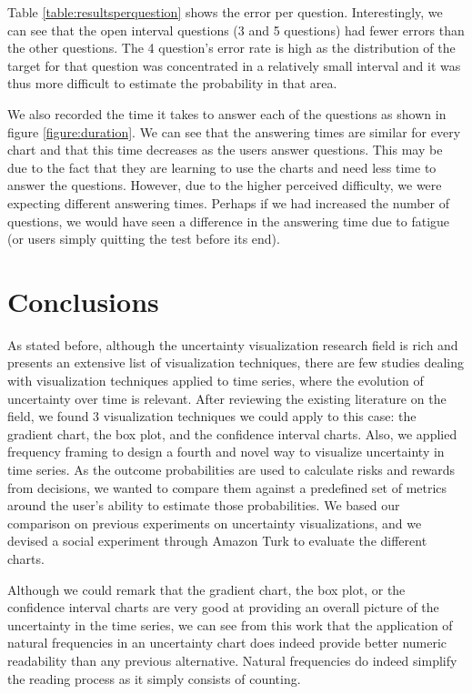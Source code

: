 \documentclass[a4paper,3p,sort&compress]{elsarticle}
\begin{document}
Table \ref{table:resultsperquestion} shows the error per question.
Interestingly, we can see that the open interval questions (3 and
5 questions) had fewer errors than the other questions. The 4
question's error rate is high as the distribution of the target for that
question was concentrated in a relatively small interval and it was thus more
difficult to estimate the probability in that area.

We also recorded the time it takes to answer each of the questions as shown in
figure \ref{figure:duration}. We can see that the answering times are similar
for every chart and that this time decreases as the users answer questions. This
may be due to the fact that they are learning to use the charts and need less
time to answer the questions. However, due to the higher perceived difficulty,
we were expecting different answering times. Perhaps if we had increased the
number of questions, we would have seen a difference in the answering time due
to fatigue (or users simply quitting the test before its end).

\section{Conclusions}
\label{sec:concl}

As stated before, although the uncertainty visualization research field is rich
and presents an extensive list of visualization techniques, there are few
studies dealing with visualization techniques applied to time series, where the
evolution of uncertainty over time is relevant. After reviewing the existing
literature on the field, we found 3 visualization techniques we could apply to
this case: the gradient chart, the box plot, and the confidence interval charts.
Also, we applied frequency framing to design a fourth and novel way to visualize
uncertainty in time series. As the outcome probabilities are used to calculate
risks and rewards from decisions, we wanted to compare them against a predefined
set of metrics around the user's ability to estimate those probabilities. We
based our comparison on previous experiments on uncertainty visualizations, and
we devised a social experiment through Amazon Turk to evaluate the different
charts.

Although we could remark that the gradient chart, the box plot, or the
confidence interval charts are very good at providing an overall picture of the
uncertainty in the time series, we can see from this work that the application
of natural frequencies in an uncertainty chart does indeed provide better
numeric readability than any previous alternative. Natural frequencies do indeed
simplify the reading process as it simply consists of counting.
\end{document}

